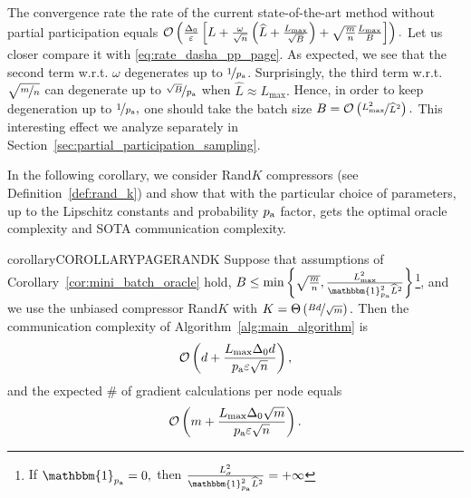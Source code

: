 \documentclass{article}
\newcommand{\algorithmname}{DASHA-PP}
\newcommand*{\probavailable}{\ensuremath{p_{\textnormal{a}}}}
\begin{document}
The convergence rate the rate of the current state-of-the-art method  without partial participation equals
$\mathcal{O}\left(\frac{\Delta_0}{\varepsilon}\left[L + \frac{\omega}{\sqrt{n}}\left(\widehat{L} + \frac{L_{\max}}{\sqrt{B}}\right) + \sqrt{\frac{m}{n}}\frac{L_{\max}}{B}\right]\right).$ Let us closer compare it with \eqref{eq:rate_dasha_pp_page}. As expected, we see that the second term w.r.t. $\omega$ degenerates up to $\nicefrac{1}{\probavailable}$. Surprisingly, the third term w.r.t. $\sqrt{\nicefrac{m}{n}}$ can degenerate up to $\nicefrac{\sqrt{B}}{\probavailable}$ when $\widehat{L} \approx L_{\max}.$ Hence, in order to keep degeneration up to $\nicefrac{1}{\probavailable},$ one should take the batch size $B = \mathcal{O}\left(\nicefrac{L_{\max}^2}{\widehat{L}^2}\right).$ This interesting effect we analyze separately in Section~\ref{sec:partial_participation_sampling}.

In the following corollary, we consider Rand$K$ compressors (see Definition~\ref{def:rand_k}) and show that with the particular choice of parameters, up to the Lipschitz constants and probability $\probavailable$ factor, \algname{\algorithmname-PAGE} gets the optimal oracle complexity and SOTA communication complexity.

\begin{restatable}{corollary}{COROLLARYPAGERANDK}
  Suppose that assumptions of Corollary~\ref{cor:mini_batch_oracle} hold, $B \leq \min\left\{\sqrt{\frac{m}{n}},\frac{L_{\max}^2}{\mathbbm{1}_{\probavailable}^2 \widehat{L}^2}\right\}$\footnote{If $\mathbbm{1}_{\probavailable} = 0,$ then $\frac{L_{\sigma}^2}{\mathbbm{1}_{\probavailable}^2 \widehat{L}^2} = +\infty$}, and we use the unbiased compressor Rand$K$ with $K = \Theta\left(\nicefrac{B d}{\sqrt{m}}\right).$ Then
  the communication complexity of Algorithm~\ref{alg:main_algorithm} is
  \begin{align}
      \label{eq:complexity:mini_batch_oracle:communication}
      \cO\left(d + \frac{L_{\max} \Delta_0 d}{\probavailable \varepsilon \sqrt{n}}\right),
  \end{align}
and the expected \# of gradient calculations per node equals
  \begin{align}
      \label{eq:complexity:mini_batch_oracle}
      \cO\left(m + \frac{L_{\max} \Delta_0 \sqrt{m}}{\probavailable \varepsilon \sqrt{n}} \right).
  \end{align}
\end{restatable}
\end{document}
